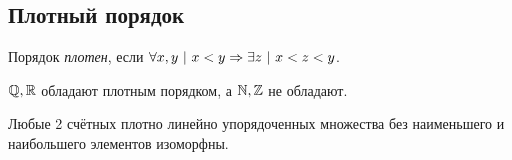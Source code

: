 \subsection{Плотный порядок}

\begin{definition}
	Порядок \textit{плотен}, если $\forall x, y\ |\ x < y \Rightarrow \exists z\ |\ x < z < y$.
\end{definition}

\begin{example}
	$\mathbb{Q}, \mathbb{R}$ обладают плотным порядком, а $\mathbb{N}, \mathbb{Z}$ не обладают.
\end{example}

\begin{theorem}
	Любые 2 счётных плотно линейно упорядоченных множества без наименьшего и наибольшего элементов изоморфны.
\end{theorem}


